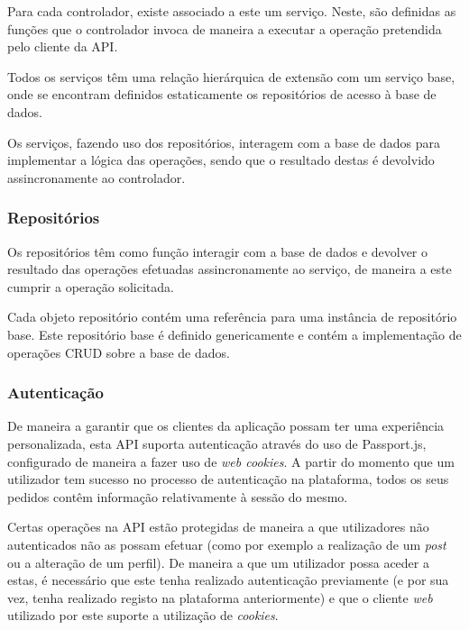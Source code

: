 Para cada controlador, existe associado a este um serviço. Neste, são definidas as funções que o controlador invoca de maneira a executar a operação pretendida pelo cliente da API.

\medskip \par

Todos os serviços têm uma relação hierárquica de extensão com um serviço base, onde se encontram definidos estaticamente os repositórios de acesso à base de dados. 

\medskip \par

Os serviços, fazendo uso dos repositórios, interagem com a base de dados para implementar a lógica das operações, sendo que o resultado destas é devolvido assincronamente ao controlador.

\subsubsection{Repositórios}

Os repositórios têm como função interagir com a base de dados e devolver o resultado das operações efetuadas assincronamente ao serviço, de maneira a este cumprir a operação solicitada.

\medskip \par

Cada objeto repositório contém uma referência para uma instância de repositório base. Este repositório base é definido genericamente e contém a implementação de operações CRUD sobre a base de dados.

\subsubsection{Autenticação}

De maneira a garantir que os clientes da aplicação possam ter uma experiência personalizada, esta API suporta autenticação através do uso de Passport.js, configurado de maneira a fazer uso de \textit{web cookies}. A partir do momento que um utilizador tem sucesso no processo de autenticação na plataforma, todos os seus pedidos contêm informação relativamente à sessão do mesmo.

\medskip \par

Certas operações na API estão protegidas de maneira a que utilizadores não autenticados não as possam efetuar (como por exemplo a realização de um \textit{post} ou a alteração de um perfil). De maneira a que um utilizador possa aceder a estas, é necessário que este tenha realizado autenticação previamente (e por sua vez, tenha realizado registo na plataforma anteriormente) e que o cliente \textit{web} utilizado por este suporte a utilização de \textit{cookies}.

